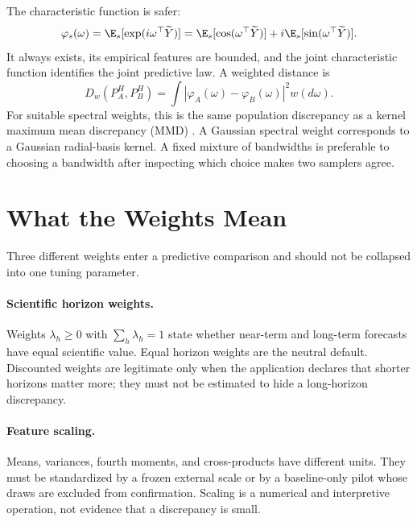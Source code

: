 The characteristic function is safer:
\begin{equation}
  \varphi_s(\omega)
  =\E_s[\exp(i\omega^\top\widetilde Y)]
  =\E_s[\cos(\omega^\top\widetilde Y)]
   +i\E_s[\sin(\omega^\top\widetilde Y)].
  \label{eq:bf-ssl-lstm-characteristic-function}
\end{equation}
It always exists, its empirical features are bounded, and the joint
characteristic function identifies the joint predictive law.  A weighted
distance is
\begin{equation}
  D_w(P_A^H,P_B^H)
  =\int
    \left|\varphi_A(\omega)-\varphi_B(\omega)\right|^2
    w(d\omega).
  \label{eq:bf-ssl-lstm-weighted-cf-distance}
\end{equation}
For suitable spectral weights, this is the same population discrepancy as a
kernel maximum mean discrepancy (MMD) \citep{gretton2012kernel,
sriperumbudur2010hilbert}.  A Gaussian spectral weight corresponds to a
Gaussian radial-basis kernel.  A fixed mixture of bandwidths is preferable to
choosing a bandwidth after inspecting which choice makes two samplers agree.

\section{What the Weights Mean}
\label{sec:bf-ssl-lstm-predictive-weights}

Three different weights enter a predictive comparison and should not be
collapsed into one tuning parameter.

\paragraph{Scientific horizon weights.}
Weights $\lambda_h\geq0$ with $\sum_h\lambda_h=1$ state whether near-term and
long-term forecasts have equal scientific value.  Equal horizon weights are
the neutral default.  Discounted weights are legitimate only when the
application declares that shorter horizons matter more; they must not be
estimated to hide a long-horizon discrepancy.

\paragraph{Feature scaling.}
Means, variances, fourth moments, and cross-products have different units.
They must be standardized by a frozen external scale or by a baseline-only
pilot whose draws are excluded from confirmation.  Scaling is a numerical and
interpretive operation, not evidence that a discrepancy is small.

